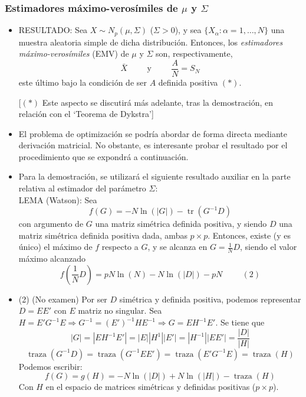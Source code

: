 \documentclass[11pt,a4paper]{article}
\begin{document}
\subsubsection{Estimadores máximo-verosímiles de \texorpdfstring{$\mu$}) y \texorpdfstring{$\Sigma$})}
\begin{itemize}
\item RESULTADO: Sea $X \sim N_{p}(\mu, \Sigma)$ ($\Sigma > 0$), y sea $\{X_{\alpha}: \alpha=1,\dots,N\}$ una muestra aleatoria simple de dicha distribución. Entonces, los \emph{estimadores máximo-verosímiles} (EMV) de $\mu$ y $\Sigma$ son, respectivamente,
$$\bar{X} \hspace{1cm} \text{y} \hspace{1cm} \frac{A}{N} = S_{N}$$
este último bajo la condición de ser $A$ definida positiva $(*)$.

[$(*)$ Este aspecto se discutirá más adelante, tras la demostración, en relación con el `Teorema de Dykstra']

\item El problema de optimización se podría abordar de forma directa mediante derivación matricial. No obstante, es interesante probar el resultado por el procedimiento que se expondrá a continuación.

\item Para la demostración, se utilizará el siguiente resultado auxiliar en la parte relativa al estimador del parámetro $\Sigma$: \\
LEMA (Watson): Sea
$$f(G) = -N\ln(|G|) - \operatorname{tr}(G^{-1}D)$$
con argumento de $G$ una matriz simétrica definida positiva, y siendo $D$ una matriz simétrica definida positiva dada, ambas $p \times p$. Entonces, existe (y es único) el máximo de $f$ respecto a $G$, y se alcanza en $G = \frac{1}{N}D$, siendo el valor máximo alcanzado
$$f(\frac{1}{N}D) = pN\ln(N) - N\ln(|D|) - pN \hspace{1cm} (2)$$

\item (2) (No examen) Por ser $D$ simétrica y definida positiva, podemos representar $D = EE'$ con $E$ matriz no singular. Sea $H = E'G^{-1}E \Rightarrow G^{-1} = (E')^{-1}HE^{-1} \Rightarrow G = EH^{-1}E'$. Se tiene que
$$|G| = |EH^{-1}E'| = |E||H^{1}||E'| = |H^{-1}||EE'| = \frac{|D|}{|H|}$$
$$\operatorname{traza}(G^{-1}D) = \operatorname{traza}(G^{-1}EE') = \operatorname{traza}(E'G^{-1}E) = \operatorname{traza}(H)$$
Podemos escribir:
$$f(G) = g(H) = -N\ln(|D|) + N\ln(|H|) - \operatorname{traza}(H)$$
Con $H$ en el espacio de matrices simétricas y definidas positivas ($p \times p$).


\end{itemize}
\end{document}
